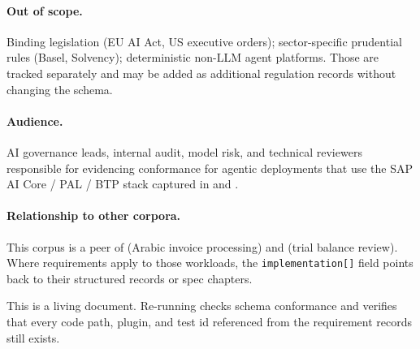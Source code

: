 \paragraph{Out of scope.} Binding legislation (EU AI Act, US executive
orders); sector-specific prudential rules (Basel, Solvency); deterministic
non-LLM agent platforms. Those are tracked separately and may be added as
additional regulation records without changing the schema.

\paragraph{Audience.} AI governance leads, internal audit, model risk, and
technical reviewers responsible for evidencing conformance for agentic
deployments that use the SAP AI Core / PAL / BTP stack captured in
 and .

\paragraph{Relationship to other corpora.} This corpus is a peer of
 (Arabic invoice processing) and  (trial
balance review). Where requirements apply to those workloads, the
\texttt{implementation[]} field points back to their structured records or
spec chapters.

\vspace{1em}
\noindent\textcolor{reggrey}{\small This is a living document. Re-running
 checks schema
conformance and verifies that every code path, plugin, and test id
referenced from the requirement records still exists.}
\clearpage
